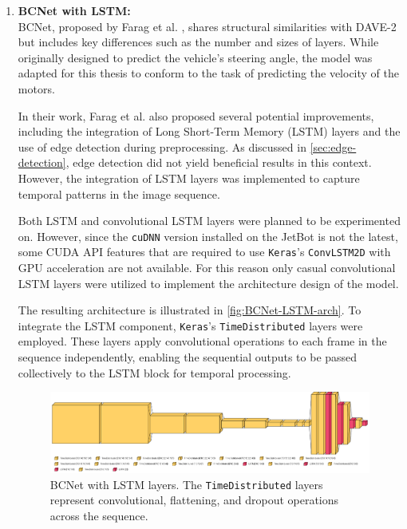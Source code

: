 \begin{enumerate}
  \item \textbf{BCNet with LSTM:} \\
    BCNet, proposed by Farag et al. \autocite{8855753}, shares structural similarities with DAVE-2 but includes key differences such as the number and sizes of layers. While originally designed to predict the vehicle’s steering angle, the model was adapted for this thesis to conform to the task of predicting the velocity of the motors.

    In their work, Farag et al. also proposed several potential improvements, including the integration of Long Short-Term Memory (LSTM) layers and the use of edge detection during preprocessing. As discussed in \autoref{sec:edge-detection}, edge detection did not yield beneficial results in this context. However, the integration of LSTM layers was implemented to capture temporal patterns in the image sequence.

    Both LSTM and convolutional LSTM layers were planned to be experimented on. However, since the \texttt{cuDNN} version installed on the JetBot is not the latest, some CUDA API features that are required to use \texttt{Keras}’s \texttt{ConvLSTM2D} with GPU acceleration are not available. For this reason only casual convolutional LSTM layers were utilized to implement the architecture design of the model.

    The resulting architecture is illustrated in \autoref{fig:BCNet-LSTM-arch}. To integrate the LSTM component, \texttt{Keras}’s \texttt{TimeDistributed} layers were employed. These layers apply convolutional operations to each frame in the sequence independently, enabling the sequential outputs to be passed collectively to the LSTM block for temporal processing.

    \begin{figure}[htbp]
      \centering
      \includegraphics[width=1.0\textwidth]{Images/BCNetLSTM_architecture.png}
      \caption{BCNet with LSTM layers. The \texttt{TimeDistributed} layers represent convolutional, flattening, and dropout operations across the sequence.}
      \label{fig:BCNet-LSTM-arch}
    \end{figure}
\end{enumerate}

